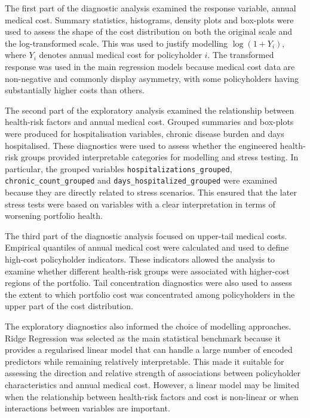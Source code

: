 \documentclass[11pt]{article}
\begin{document}
	The first part of the diagnostic analysis examined the response variable, annual medical cost. Summary statistics, histograms, density plots and box-plots were used to assess the shape of the cost distribution on both the original scale and the log-transformed scale. This was used to justify modelling \(\log(1 + Y_i)\), where \(Y_i\) denotes annual medical cost for policyholder \(i\). The transformed response was used in the main regression models because medical cost data are non-negative and commonly display asymmetry, with some policyholders having substantially higher costs than others.
	
	The second part of the exploratory analysis examined the relationship between health-risk factors and annual medical cost. Grouped summaries and box-plots were produced for hospitalisation variables, chronic disease burden and days hospitalised. These diagnostics were used to assess whether the engineered health-risk groups provided interpretable categories for modelling and stress testing. In particular, the grouped variables \verb|hospitalizations_grouped|, \verb|chronic_count_grouped| and \verb|days_hospitalized_grouped| were examined because they are directly related to stress scenarios. This ensured that the later stress tests were based on variables with a clear interpretation in terms of worsening portfolio health.
	
	The third part of the diagnostic analysis focused on upper-tail medical costs. Empirical quantiles of annual medical cost were calculated and used to define high-cost policyholder indicators. These indicators allowed the analysis to examine whether different health-risk groups were associated with higher-cost regions of the portfolio. Tail concentration diagnostics were also used to assess the extent to which portfolio cost was concentrated among policyholders in the upper part of the cost distribution.
	
	The exploratory diagnostics also informed the choice of modelling approaches. Ridge Regression was selected as the main statistical benchmark because it provides a regularised linear model that can handle a large number of encoded predictors while remaining relatively interpretable. This made it suitable for assessing the direction and relative strength of associations between policyholder characteristics and annual medical cost. However, a linear model may be limited when the relationship between health-risk factors and cost is non-linear or when interactions between variables are important.
	
\end{document}
